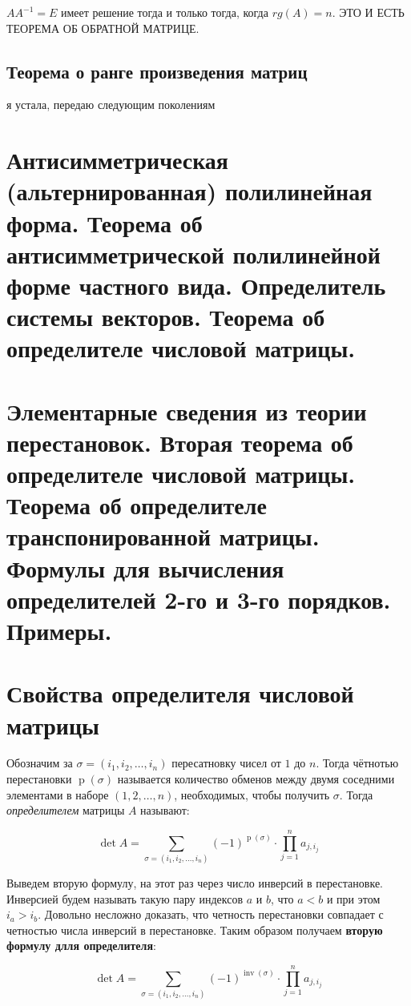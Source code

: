 \documentclass{article}
\begin{document}
$AA^{-1} = E$ имеет решение тогда и только тогда, когда $rg(A) = n$. ЭТО И ЕСТЬ ТЕОРЕМА ОБ ОБРАТНОЙ МАТРИЦЕ.

\subsection{Теорема о ранге произведения матриц}
я устала, передаю следующим поколениям

\newpage
\section{Антисимметрическая (альтернированная) полилинейная форма. Теорема об антисимметрической полилинейной форме частного вида. Определитель системы векторов. Теорема об определителе числовой матрицы.}

\newpage
\section{Элементарные сведения из теории перестановок. Вторая теорема об определителе числовой матрицы. Теорема об определителе транспонированной матрицы. Формулы для вычисления определителей 2-го и 3-го порядков. Примеры.}

\newpage
\section{Свойства определителя числовой матрицы}
Обозначим за $\sigma = (i_1, i_2, \ldots, i_n)$ пересатновку чисел от $1$ до $n$. Тогда чётнотью перестановки $\operatorname{p}(\sigma)$ называется количество обменов между двумя соседними элементами в наборе $(1, 2, \ldots, n)$, необходимых, чтобы получить $\sigma$. Тогда \textit{определителем} матрицы $A$ называют:

$$\operatorname{det}A = \sum_{\sigma = (i_1, i_2, \ldots, i_n)} (-1)^{\operatorname{p}(\sigma)} \cdot \prod_{j = 1}^{n}a_{j, i_j}$$

Выведем вторую формулу, на этот раз через число инверсий в перестановке. Инверсией будем называть такую пару индексов $a$ и $b$, что $a < b$ и при этом $i_a > i_b$. Довольно несложно доказать, что четность перестановки совпадает с четностью числа инверсий в перестановке. Таким образом получаем \textbf{вторую формулу длля определителя}:

$$\operatorname{det}A = \sum_{\sigma = (i_1, i_2, \ldots, i_n)} (-1)^{\operatorname{inv}(\sigma)} \cdot \prod_{j = 1}^{n}a_{j, i_j}$$
\end{document}

